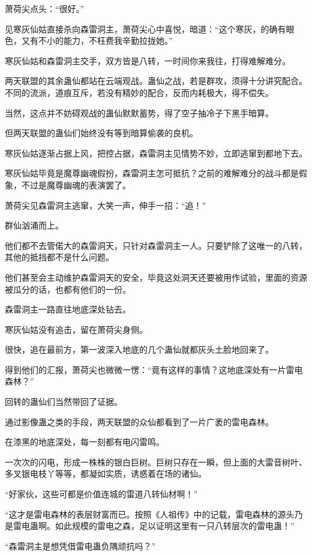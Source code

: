 \begin{this_body}
萧荷尖点头：“很好。”

见寒灰仙姑直接杀向森雷洞主，萧荷尖心中喜悦，暗道：“这个寒灰，的确有眼色，又有不小的能力，不枉费我辛勤拉拢她。”

寒灰仙姑和森雷洞主交手，双方皆是八转，一时间你来我往，打得难解难分。

两天联盟的其余蛊仙都站在云端观战。蛊仙之战，若是群攻，须得十分讲究配合。不同的流派，道痕互斥，若没有精妙的配合，反而内耗极大，得不偿失。

当然，这点并不妨碍观战的蛊仙默默蓄势，得了空子抽冷子下黑手暗算。

但两天联盟的蛊仙们始终没有等到暗算偷袭的良机。

寒灰仙姑逐渐占据上风，把控占据，森雷洞主见情势不妙，立即逃窜到都地下去。

寒灰仙姑毕竟是魔尊幽魂假扮，森雷洞主怎可抵抗？之前的难解难分的战斗都是假象，不过是魔尊幽魂的表演罢了。

萧荷尖见森雷洞主逃窜，大笑一声，伸手一招：“追！”

群仙汹涌而上。

他们都不去管偌大的森雷洞天，只针对森雷洞主一人。只要铲除了这唯一的八转，其他的抵挡都不是什么问题。

他们甚至会主动维护森雷洞天的安全，毕竟这处洞天还要被用作试验，里面的资源被瓜分的话，也都有他们的一份。

森雷洞主一路直往地底深处钻去。

寒灰仙姑没有追击，留在萧荷尖身侧。

很快，追在最前方，第一波深入地底的几个蛊仙就都灰头土脸地回来了。

得到他们的汇报，萧荷尖也微微一愣：“竟有这样的事情？这地底深处有一片雷电森林？”

回转的蛊仙们当然带回了证据。

通过影像蛊之类的手段，两天联盟的众仙都看到了一片广袤的雷电森林。

在漆黑的地底深处，每一刻都有电闪雷鸣。

一次次的闪电，形成一株株的银白巨树。巨树只存在一瞬，但上面的大雷音树叶、多叉银电枝丫等等，都凝如实质，诱惑着在场的诸仙。

“好家伙，这些可都是价值连城的雷道八转仙材啊！”

“这才是雷电森林的表层财富而已。按照《人祖传》中的记载，雷电森林的源头乃是雷电蛊啊。如此规模的雷电之森，足以证明这里有一只八转层次的雷电蛊！”

“森雷洞主是想凭借雷电蛊负隅顽抗吗？”


\end{this_body}
